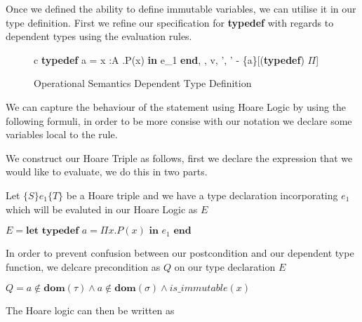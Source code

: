 \documentclass[a4paper,12pt]{report}
\begin{document}
\par
Once we defined the ability to define immutable variables, we can utilise it in 
our type definition. First we refine our specification for \textbf{typedef} 
with regards to dependent types using the evaluation rules.

\begin{figure}[H]
  \begin{center}
    \begin{tabular}{c}
      {\langle \textbf{typedef } a = \Pi x :A .P(x) \textbf{ in }e_1\textbf{ end}, 
      \sigma, \tau \rangle \longrightarrow 
        \langle v, \sigma', \tau' - \{a\}\rangle}[(\textbf{typedef}) $\Pi$]
    \end{tabular}
  \end{center}
  \caption{Operational Semantics Dependent Type Definition}
\end{figure}


\par
We can capture the behaviour of the statement using Hoare Logic 
by using the following formuli, 
in order to be more consise with our notation we declare some variables local to 
the rule.

\par
We construct our Hoare Triple as follows, first we declare 
the expression that we would like to evaluate, we do this in two parts.

Let $\{S\}e_1\{T\}$ be a Hoare triple and we have a type declaration incorporating 
$e_1$ which will be evaluted in our Hoare Logic as $E$

\begin{center}
  $E = \textbf{let typedef }a = \Pi x. P(x) \textbf{ in } e_1 \textbf{ end }$
\end{center}
\par

In order to prevent confusion between our postcondition and our dependent type 
function, we delcare precondition as $Q$ on our type declaration $E$
\begin{center}
  $Q = a \notin \textbf{dom}(\tau) \wedge a \notin \textbf{dom}(\sigma) \wedge is\_immutable(x)$
\end{center}

\par
The Hoare logic can then be written as
\end{document}
